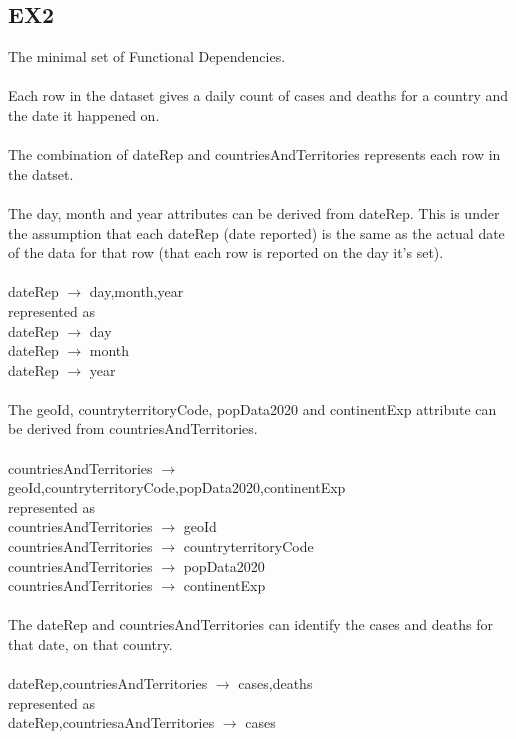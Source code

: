 \documentclass[]{article}
\begin{document}
\subsection{EX2}
The minimal set of Functional Dependencies.\\\\
Each row in the dataset gives a daily count of cases and deaths for a country and the date it happened on.\\\\
The combination of dateRep and countriesAndTerritories represents each row in the datset.\\\\
The day, month and year attributes can be derived from dateRep. This is under the assumption that each dateRep (date reported) is the same as the actual date of the data for that row (that each row is reported on the day it's set).\\\\
dateRep $\rightarrow$ day,month,year\\
represented as\\
dateRep $\rightarrow$ day\\
dateRep $\rightarrow$ month\\
dateRep $\rightarrow$ year\\
\\The geoId, countryterritoryCode, popData2020 and continentExp attribute can be derived from countriesAndTerritories.\\
\\countriesAndTerritories $\rightarrow$ geoId,countryterritoryCode,popData2020,continentExp\\
represented as\\
countriesAndTerritories $\rightarrow$ geoId\\
countriesAndTerritories $\rightarrow$ countryterritoryCode\\
countriesAndTerritories $\rightarrow$ popData2020\\
countriesAndTerritories $\rightarrow$ continentExp\\
\\The dateRep and countriesAndTerritories can identify the cases and deaths for that date, on that country.\\
\\dateRep,countriesAndTerritories $\rightarrow$ cases,deaths\\
represented as\\
dateRep,countriesaAndTerritories $\rightarrow$ cases\\
\end{document}
